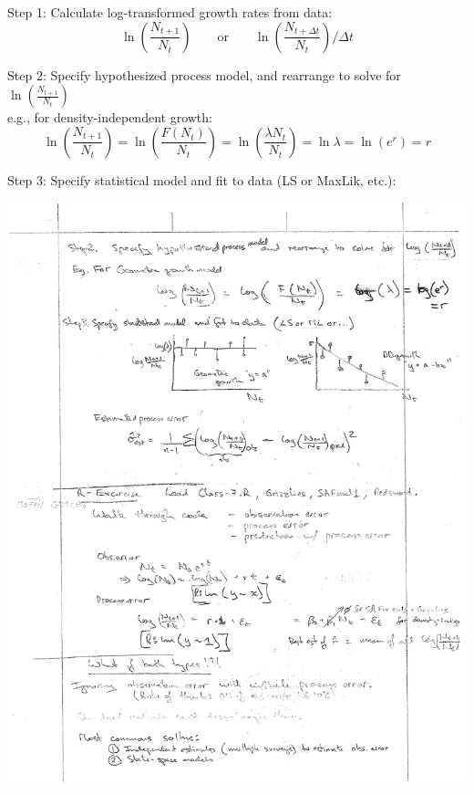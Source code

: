 \documentclass{article}
\newcommand{\ind}{\-\hspace{1cm}}
\begin{document}
Step 1: Calculate log-transformed growth rates from data:\\
\begin{equation*}
	\ln \left(\frac{N_{t+1}}{N_t}\right) \quad \quad \text{or} \quad \quad 	\ln\left(\frac{N_{t+\Delta t}}{N_t}\right) \bigg / \Delta t
\end{equation*}

Step 2: Specify hypothesized process model, and rearrange to solve for $\ln \left(\frac{N_{t+1}}{N_t}\right)$\\
\ind e.g., for density-independent growth:\\
\begin{equation*}
	\ln\left(\frac{N_{t+1}}{N_t}\right) = \ln\left(\frac{F(N_t)}{N_t}\right) = \ln\left(\frac{\lambda N_t}{N_t}\right) = \ln \lambda = \ln (e^r) = r
\end{equation*}

Step 3: Specify statistical model and fit to data (LS or MaxLik, etc.):
\begin{center}
	\includegraphics[width=15cm]{figs/image3.pdf}
\end{center}
\end{document}
